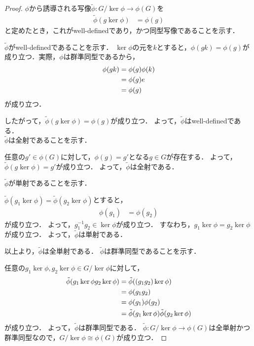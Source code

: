\begin{proof}
    $\phi$から誘導される写像$\tilde{\phi} : G/\ker\phi\to \phi(G)$を
    \begin{align}
        \tilde{\phi}(g\ker\phi) &= \phi(g) 
    \end{align}
    と定めたとき，これがwell-definedであり，かつ同型写像であることを示す．

    $\tilde{\phi}$がwell-definedであることを示す．
    $\ker\phi$の元を$k$とすると，$\phi(gk)=\phi(g)$が成り立つ．実際，$\phi$は群準同型であるから，
    \begin{align}
        \phi(gk) &= \phi(g)\phi(k) \notag\\
        &= \phi(g)e \notag\\
        &= \phi(g) \notag
    \end{align}
    が成り立つ．

    したがって，$\tilde{\phi}(g\ker\phi)=\phi(g)$が成り立つ．
    よって，$\tilde{\phi}$はwell-definedである．\\

    $\tilde{\phi}$は全射であることを示す．

    任意の$g'\in \phi(G)$に対して，$\phi(g)=g'$となる$g\in G$が存在する．
    よって，$\tilde{\phi}(g\ker\phi)=g'$が成り立つ．
    よって，$\tilde{\phi}$は全射である．
    
    
    $\tilde{\phi}$が単射であることを示す．

    $\tilde{\phi}(g_1\ker\phi)=\tilde{\phi}(g_2\ker\phi)$とすると，
    \begin{align}
        \phi(g_1) &= \phi(g_2)
    \end{align}
    が成り立つ．
    よって，$g_1^{-1}g_2\in \ker\phi$が成り立つ．
    すなわち，$g_1\ker\phi=g_2\ker\phi$が成り立つ．
    よって，$\tilde{\phi}$は単射である．

    以上より，$\tilde{\phi}$は全単射である．
    $\tilde{\phi}$は群準同型であることを示す．

    任意の$g_1\ker\phi,g_2\ker\phi\in G/\ker\phi$に対して，
    \begin{align}
        \tilde{\phi}(g_1\ker\phi g_2\ker\phi) &= \tilde{\phi}((g_1g_2)\ker\phi) \notag\\
        &= \phi(g_1g_2) \notag\\
        &= \phi(g_1)\phi(g_2) \notag\\
        &= \tilde{\phi}(g_1\ker\phi)\tilde{\phi}(g_2\ker\phi) \notag
    \end{align}
    が成り立つ．
    よって，$\tilde{\phi}$は群準同型である．
    $\tilde{\phi} : G/\ker\phi\to \phi(G)$は全単射かつ群準同型なので，$G/\ker\phi \cong \phi(G)$が成り立つ．
\end{proof}


